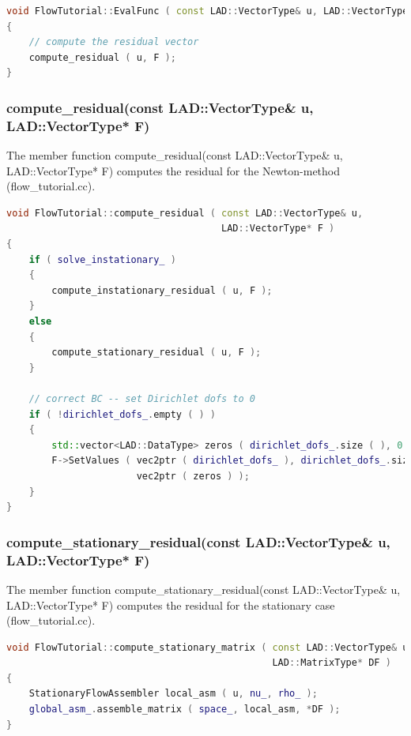 \documentclass[a4paper, 11pt, twoside]{article}
\begin{document}
\begin{lstlisting}[language=C++, basicstyle={\footnotesize, \ttfamily}, keywordstyle=\color{blue},  numbers=none, tabsize=4]
void FlowTutorial::EvalFunc ( const LAD::VectorType& u, LAD::VectorType* F )
{
    // compute the residual vector
    compute_residual ( u, F );
}
\end{lstlisting}

\subsubsection{compute\_residual(const LAD::VectorType\& u, LAD::VectorType* F)}
The member function compute\_residual(const LAD::VectorType\& u, LAD::VectorType* F) computes the residual for the Newton-method (flow\_tutorial.cc).

\begin{lstlisting}[language=C++, basicstyle={\footnotesize, \ttfamily}, keywordstyle=\color{blue},  numbers=none, tabsize=4]
void FlowTutorial::compute_residual ( const LAD::VectorType& u,
                                      LAD::VectorType* F )
{
    if ( solve_instationary_ )
    {
        compute_instationary_residual ( u, F );
    }
    else
    {
        compute_stationary_residual ( u, F );
    }

    // correct BC -- set Dirichlet dofs to 0
    if ( !dirichlet_dofs_.empty ( ) )
    {
        std::vector<LAD::DataType> zeros ( dirichlet_dofs_.size ( ), 0. );
        F->SetValues ( vec2ptr ( dirichlet_dofs_ ), dirichlet_dofs_.size ( ),
                       vec2ptr ( zeros ) );
    }
}
\end{lstlisting}

\subsubsection{compute\_stationary\_residual(const LAD::VectorType\& u, LAD::VectorType* F)}
The member function compute\_stationary\_residual(const LAD::VectorType\& u, LAD::VectorType* F) computes the residual for the stationary case (flow\_tutorial.cc).

\begin{lstlisting}[language=C++, basicstyle={\footnotesize, \ttfamily}, keywordstyle=\color{blue}, numbers=none, tabsize=4]
void FlowTutorial::compute_stationary_matrix ( const LAD::VectorType& u,
                                               LAD::MatrixType* DF )
{
    StationaryFlowAssembler local_asm ( u, nu_, rho_ );
    global_asm_.assemble_matrix ( space_, local_asm, *DF );
}

\end{lstlisting}
\end{document}
